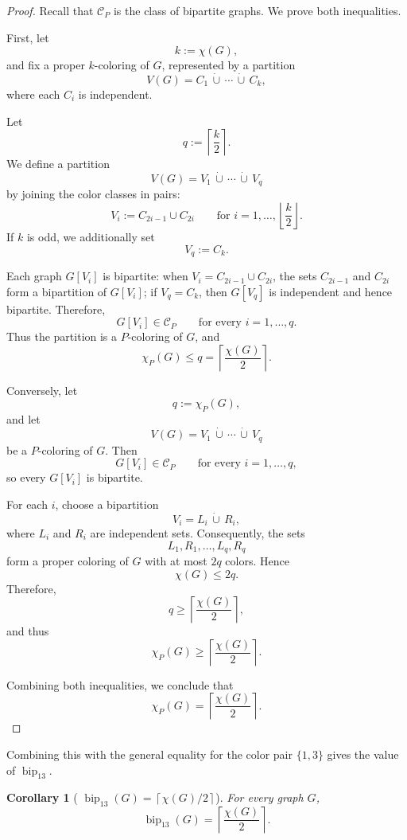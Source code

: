 \documentclass[12pt]{article}
\theoremstyle{plain}
\newtheorem{corollary}[theorem]{Corollary}
\theoremstyle{definition}
\theoremstyle{remark}
\theoremstyle{definition}
\newcommand{\biplabel}{\mathrm{bip}}
\DeclareRobustCommand{\bipparam}[1]{%
  \ensuremath{\mathop{\biplabel}\nolimits_{#1}}%
}
\begin{document}
\begin{proof}
Recall that \(\mathcal C_P\) is the class of bipartite graphs. We prove both
inequalities.

First, let
\[
k:=\chi(G),
\]
and fix a proper \(k\)-coloring of \(G\), represented by a partition
\[
V(G)=C_1\,\dot\cup\,\cdots\,\dot\cup\,C_k,
\]
where each \(C_i\) is independent.

Let
\[
q:=\left\lceil\frac{k}{2}\right\rceil.
\]
We define a partition
\[
V(G)=V_1\,\dot\cup\,\cdots\,\dot\cup\,V_q
\]
by joining the color classes in pairs:
\[
V_i:=C_{2i-1}\cup C_{2i}
\qquad
\text{for }i=1,\dots,\left\lfloor\frac{k}{2}\right\rfloor.
\]
If \(k\) is odd, we additionally set
\[
V_q:=C_k.
\]

Each graph \(G[V_i]\) is bipartite: when \(V_i=C_{2i-1}\cup C_{2i}\), the
sets \(C_{2i-1}\) and \(C_{2i}\) form a bipartition of \(G[V_i]\); if
\(V_q=C_k\), then \(G[V_q]\) is independent and hence bipartite. Therefore,
\[
G[V_i]\in\mathcal C_P
\qquad
\text{for every }i=1,\dots,q.
\]
Thus the partition is a \(P\)-coloring of \(G\), and
\[
\chi_P(G)
\le
q
=
\left\lceil\frac{\chi(G)}{2}\right\rceil.
\]

Conversely, let
\[
q:=\chi_P(G),
\]
and let
\[
V(G)=V_1\,\dot\cup\,\cdots\,\dot\cup\,V_q
\]
be a \(P\)-coloring of \(G\). Then
\[
G[V_i]\in\mathcal C_P
\qquad
\text{for every }i=1,\dots,q,
\]
so every \(G[V_i]\) is bipartite.

For each \(i\), choose a bipartition
\[
V_i=L_i\,\dot\cup\,R_i,
\]
where \(L_i\) and \(R_i\) are independent sets. Consequently, the sets
\[
L_1,R_1,\dots,L_q,R_q
\]
form a proper coloring of \(G\) with at most \(2q\) colors. Hence
\[
\chi(G)\le 2q.
\]
Therefore,
\[
q\ge
\left\lceil\frac{\chi(G)}{2}\right\rceil,
\]
and thus
\[
\chi_P(G)
\ge
\left\lceil\frac{\chi(G)}{2}\right\rceil.
\]

Combining both inequalities, we conclude that
\[
\chi_P(G)
=
\left\lceil\frac{\chi(G)}{2}\right\rceil.
\]
\end{proof}



Combining this with the general equality for the color pair
\(\{1,3\}\) gives the value of \(\bipparam{13}\).



\begin{corollary}[
\texorpdfstring{\(\bipparam{13}(G)=\left\lceil\chi(G)/2\right\rceil\)}
{bip13(G) = ceiling of chi(G)/2}
]
\label{cor:bip13-chi}
For every graph \(G\),
\[
\bipparam{13}(G)
=
\left\lceil\frac{\chi(G)}{2}\right\rceil.
\]
\end{corollary}
\end{document}
